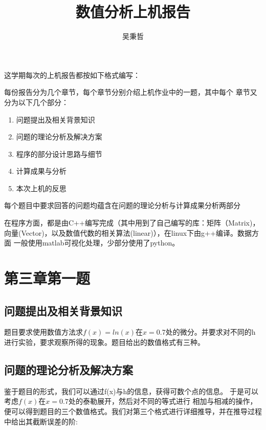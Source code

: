 \documentclass{ctexart}
\author{吴秉哲}
\title{数值分析上机报告}
\begin{document}
\maketitle
这学期每次的上机报告都按如下格式编写：

每份报告分为几个章节，每个章节分别介绍上机作业中的一题，其中每个
章节又分为以下几个部分：
\begin{enumerate}
\item 问题提出及相关背景知识
\item 问题的理论分析及解决方案
\item 程序的部分设计思路与细节
\item 计算成果与分析
\item 本次上机的反思
\end{enumerate}
每个题目中要求回答的问题均蕴含在问题的理论分析与计算成果分析两部分

在程序方面，都是由C++编写完成（其中用到了自己编写的库：矩阵（Matrix)，向量(Vector)，以及数值代数的相关算法(linear)），在linux下由g++编译。数据方面
一般使用matlab可视化处理，少部分使用了python。
\section{第三章第一题}
\subsection{问题提出及相关背景知识}
题目要求使用数值方法求$f(x)=ln(x)$在$x=0.7$处的微分。并要求对不同的h进行实验，要求观察所得的现象。题目给出的数值格式有三种。
\subsection{问题的理论分析及解决方案}
鉴于题目的形式，我们可以通过f(x)与h的信息，获得可数个点的信息。
于是可以考虑$f(x)$在$x=0.7$处的泰勒展开，然后对不同的等式进行
相加与相减的操作，便可以得到题目的三个数值格式。我们对第三个格式进行详细推导，并在推导过程中给出其截断误差的阶:
\end{document}
